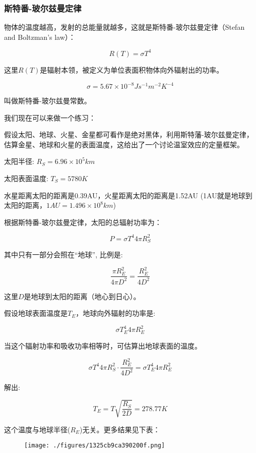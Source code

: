 \subsubsection{斯特番-玻尔兹曼定律}

物体的温度越高，发射的总能量就越多，这就是斯特番-玻尔兹曼定律（Stefan and Boltzman's law）：

\begin{equation}
R(T) = \sigma T^4~
\end{equation}

这里$R(T)$是辐射本领，被定义为单位表面积物体向外辐射出的功率。

\begin{equation}
\sigma = 5.67 \times 10^{-8} J s^{-1} m^{-2} K^{-4}~
\end{equation}

叫做斯特番-玻尔兹曼常数。

我们现在可以来做一个练习：

假设太阳、地球、火星、金星都可看作是绝对黑体，利用斯特藩-玻尔兹曼定律，估算金星、地球和火星的表面温度，这给出了一个讨论温室效应的定量框架。

太阳半径: $R_S  = 6.96 \times 10^5 km$

太阳表面温度: $T_S  = 5780K$

水星距离太阳的距离是0.39AU，火星距离太阳的距离是1.52AU (1AU就是地球到太阳的距离，$1AU = 1.496 \times 10^8 km$)

根据斯特番-玻尔兹曼定律，太阳的总辐射功率为：

\begin{equation}
P = \sigma T^4 4 \pi R_S^2~
\end{equation}

其中只有一部分会照在“地球”, 比例是: 

\begin{equation}
\frac{\pi R_E^2}{4 \pi D^2}= \frac{R_E^2}{4 D^2}~
\end{equation}

这里$D$是地球到太阳的距离（地心到日心）。

假设地球表面温度是$T_E$，地球向外辐射的功率是: 

\begin{equation}
\sigma T_E^4 4 \pi R_E^2~
\end{equation}

当这个辐射功率和吸收功率相等时，可估算出地球表面的温度。

\begin{equation}
\sigma T^4 4 \pi R_S^2 \cdot \frac{R_E^2}{4 D^2} = \sigma T_E^4 4 \pi R_E^2~
\end{equation}

解出:

\begin{equation}
T_E = T \sqrt{\frac{R_S}{2D}} = 278.77 K~
\end{equation}

这个温度与地球半径($R_E$)无关。更多结果见下表：

\begin{figure}[ht]
\centering
\texttt{[image: ./figures/1325cb9ca390200f.png]}
\caption \label{fig_QMPre5_8}
\end{figure}

